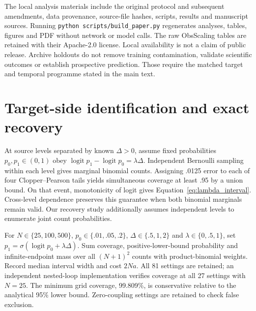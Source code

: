 The local analysis materials include the original protocol and subsequent amendments, data provenance, source-file hashes, scripts, results and manuscript sources. Running \texttt{python scripts/build\_paper.py} regenerates analyses, tables, figures and PDF without network or model calls. The raw ObsScaling tables are retained with their Apache-2.0 license. Local availability is not a claim of public release. Archive holdouts do not remove training contamination, validate scientific outcomes or establish prospective prediction. Those require the matched target and temporal programme stated in the main text.

\section{Target-side identification and exact recovery}
\label{app:identification}
At source levels separated by known $\Delta>0$, assume fixed probabilities $p_0,p_1\in(0,1)$ obey $\operatorname{logit}p_1-\operatorname{logit}p_0=\lambda\Delta$. Independent Bernoulli sampling within each level gives marginal binomial counts. Assigning .0125 error to each of four Clopper--Pearson tails yields simultaneous coverage at least .95 by a union bound. On that event, monotonicity of logit gives Equation~\ref{eq:lambda_interval}. Cross-level dependence preserves this guarantee when both binomial marginals remain valid. Our recovery study additionally assumes independent levels to enumerate joint count probabilities.

For $N\in\{25,100,500\}$, $p_0\in\{.01,.05,.2\}$, $\Delta\in\{.5,1,2\}$ and $\lambda\in\{0,.5,1\}$, set $p_1=\sigma(\operatorname{logit}p_0+\lambda\Delta)$. Sum coverage, positive-lower-bound probability and infinite-endpoint mass over all $(N+1)^2$ counts with product-binomial weights. Record median interval width and cost $2Na$. All 81 settings are retained; an independent nested-loop implementation verifies coverage at all 27 settings with $N=25$. The minimum grid coverage, 99.809\%, is conservative relative to the analytical 95\% lower bound. Zero-coupling settings are retained to check false exclusion.

\begin{table}[htbp]\centering\small
\caption{Exact recovery at coupling 1 and separation 2. Low initial success makes unbounded intervals more likely. The artifact retains all 81 settings, including zero coupling and smaller separations.}

\end{table}

